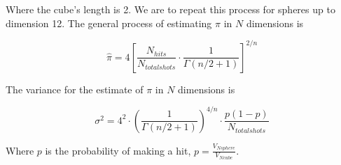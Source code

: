 \documentclass[11pt]{amsart}
\begin{document}
Where the cube's length is 2.  We are to repeat this process for spheres up to dimension 12.  The general process of estimating $\pi$ in $N$ dimensions is

\begin{equation}
\hat \pi = 4 \left[ \frac{N_{hits}}{N_{totalshots}} \cdot \frac{1}{\Gamma(n/2+1)} \right] ^{2/n}
\end{equation}
\vspace{5 mm}

The variance for the estimate of $\pi$ in $N$ dimensions is 

\begin{equation}
\sigma ^2 = 4^2 \cdot \left( \frac{1}{\Gamma(n/2+1)} \right) ^{4/n} \cdot \frac{p (1-p)}{N_{totalshots}}
\end{equation}
\vspace{5 mm}

Where $p$ is the probability of making a hit, $p= \frac{V_{Nsphere}}{V_{Ncube}}$.
\end{document}
